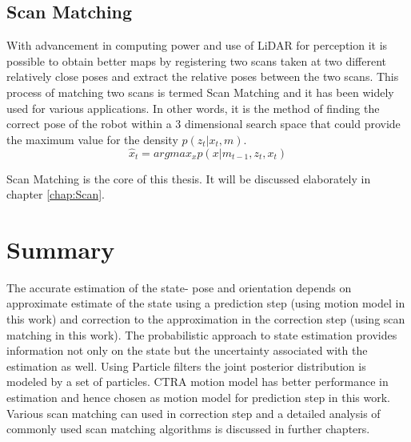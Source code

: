 \subsection{Scan Matching}
With advancement in computing power and use of LiDAR for perception it is possible to obtain better maps by registering two scans taken at two different relatively close poses and extract the relative poses between the two scans. This process of matching two scans is termed Scan Matching and it has been widely used for various applications. In other words, it is the method of finding the correct pose of the robot within a 3 dimensional search space that could provide the maximum value for the density $p(z_t | x_t, m)$. 
\begin{equation}
    \hat{x} _{t} = argmax_{x} p(x|m_{t-1}, z_t, x_t)
\end{equation}
\par
Scan Matching is the core of this thesis. It will be discussed elaborately in chapter \ref{chap:Scan}.

\section{Summary}
The accurate estimation of the state- pose and orientation depends on approximate estimate of the state using a prediction step (using motion model in this work) and correction to the approximation in the correction step (using scan matching in this work). The probabilistic approach to state estimation provides information not only on the state but the uncertainty associated with the estimation as well. Using Particle filters the joint posterior distribution is modeled by a set of particles. CTRA motion model has better performance in estimation and hence chosen as  motion model for  prediction step in this work. Various scan matching can used in correction step and a detailed analysis of commonly used scan matching algorithms is discussed in further chapters.